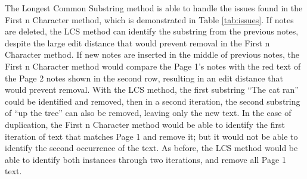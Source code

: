 \documentclass[print]{nuthesis}
\begin{document}
The Longest Common Substring method is able to handle the issues found in the First n Character method, which is demonstrated in Table \ref{tab:issues}.
If notes are deleted, the LCS method can identify the substring from the previous notes, despite the large edit distance that would prevent removal in the First n Character method.
If new notes are inserted in the middle of previous notes, the First n Character method would compare the Page 1's notes with the red text of the Page 2 notes shown in the second row, resulting in an edit distance that would prevent removal.
With the LCS method, the first substring ``The cat ran'' could be identified and removed, then in a second iteration, the second substring of ``up the tree'' can also be removed, leaving only the new text.
In the case of duplication, the First n Character method would be able to identify the first iteration of text that matches Page 1 and remove it; but it would not be able to identify the second occurrence of the text.
As before, the LCS method would be able to identify both instances through two iterations, and remove all Page 1 text.
\end{document}
